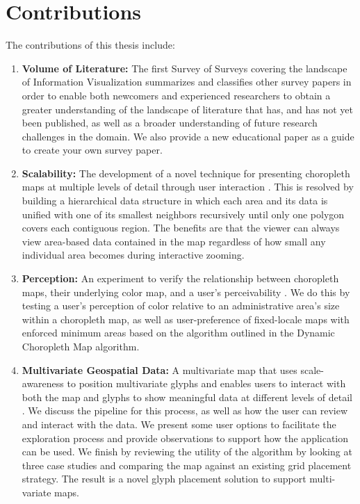 \section{Contributions}
The contributions of this thesis include:
\begin{enumerate}
\item \textbf{Volume of Literature:} The first Survey of Surveys covering the landscape of Information Visualization \cite{mcnabb2017sos} summarizes and classifies other survey papers in order to enable both newcomers and experienced researchers to obtain a greater understanding of the landscape of literature that has, and has not yet been published, as well as a broader understanding of future research challenges in the domain. We also provide a new educational paper as a guide to create your own survey paper.
\item \textbf{Scalability: }The development of a novel technique for presenting choropleth maps at multiple levels of detail through user interaction \cite{mcnabb2018dynamic}. This is resolved by building a hierarchical data structure in which each area and its data is unified with one of its smallest neighbors recursively until only one polygon covers each contiguous region. The benefits are that the viewer can always view area-based data contained in the map regardless of how small any individual area becomes during interactive zooming.
\item \textbf{Perception:} An experiment to verify the relationship between choropleth maps, their underlying color map, and a user's perceivability \cite{mcnabb2018when}. We do this by testing a user's perception of color relative to an administrative area's size within a choropleth map, as well as user-preference of fixed-locale maps with enforced minimum areas based on the algorithm outlined in the Dynamic Choropleth Map algorithm.
\item \textbf{Multivariate Geospatial Data:} A multivariate map that uses scale-awareness to position multivariate glyphs and enables users to interact with both the map and glyphs to show meaningful data at different levels of detail \cite{mcnabb2019multivariate}. We discuss the pipeline for this process, as well as how the user can review and interact with the data. We present some user options to facilitate the exploration process and provide observations to support how the application can be used. We finish by reviewing the utility of the algorithm by looking at three case studies and comparing the map against an existing grid placement strategy. The result is a novel glyph placement solution to support multi-variate maps.
\end{enumerate}

